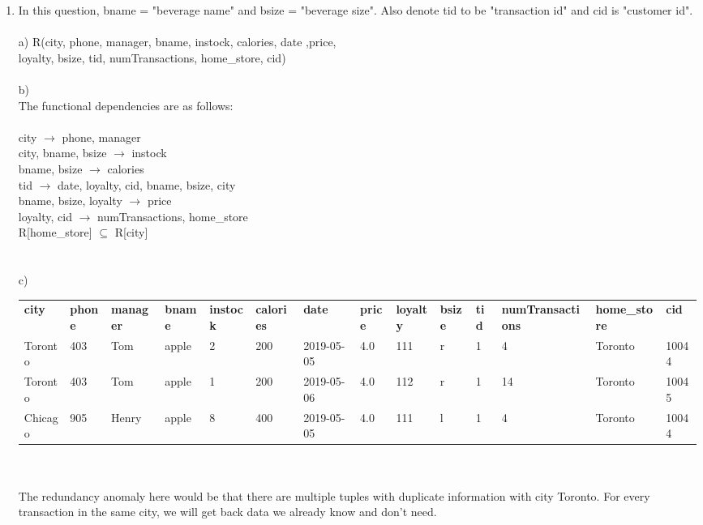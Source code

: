\documentclass{article}
\begin{document}
\begin{enumerate}
    \item %
    In this question, bname = "beverage name" and bsize = "beverage size". Also denote tid to be "transaction id" and cid is "customer id".\\\\
	a)
	R(city, phone, manager, bname, instock, calories, date ,price,\\
	 loyalty, bsize, tid, numTransactions, home\_store, cid)\\\\
	b)\\The functional dependencies are as follows:\\\\
		city $\rightarrow$ phone, manager\\
		city, bname, bsize $\rightarrow$ instock\\
		bname, bsize $\rightarrow$ calories\\
		tid $\rightarrow$ date, loyalty, cid, bname, bsize, city\\
		bname, bsize, loyalty $\rightarrow$ price\\
		loyalty, cid $\rightarrow$ numTransactions, home\_store\\
		R[home\_store] $\subseteq$ R[city]
	\\\\\\
	c)\begin{table}[h]
		  \centering
		\begin{adjustbox}{width=1.1\textwidth}
		\begin{tabular}{llllllllllllll}
			\textbf{city}&\textbf{phone}&\textbf{manager}&\textbf{bname}&\textbf{instock}&\textbf{calories}&\textbf{date}&\textbf{price}&\textbf{loyalty}&\textbf{bsize}&\textbf{tid}&\textbf{numTransactions}&\textbf{home\_store}&\textbf{cid}\\
			Toronto & 403 & Tom & apple & 2 & 200 & 2019-05-05 & 4.0 & 111 & r  & 1 &4 & Toronto & 10044\\
			Toronto & 403 & Tom & apple & 1 & 200 & 2019-05-06 & 4.0 & 112 & r  & 1 &14 & Toronto & 10045 \\	
			Chicago & 905 & Henry & apple & 8 & 400 & 2019-05-05 & 4.0 & 111 & l  & 1 &4 & Toronto & 10044
		\end{tabular}
		\end{adjustbox}
		\end{table}
		\\\\
		The redundancy anomaly here would be that there are multiple tuples with duplicate information with city Toronto. For every transaction in the same city, we will get back data we already know and don't need.\\\\

\end{enumerate}
\end{document}

